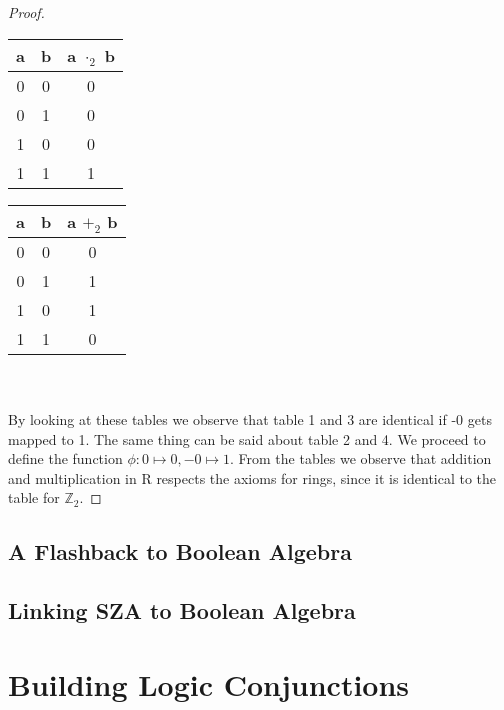 \documentclass[12pt]{report}
\theoremstyle{definition}
\theoremstyle{remark}
\begin{document}
\begin{proof}
\begin{minipage}{0.2\textwidth}
\begin{center}
\begin{tabular}{| c | c || c |}
            a & b & a $\cdot_2$ b \\ \hline
            0 & 0 & 0 \\ \hline
            0 & 1 & 0 \\ \hline
            1 & 0 & 0 \\ \hline
            1 & 1 & 1 \\ \hline
          \end{tabular}
        \end{center}
      \end{minipage}
      \begin{minipage}{0.2\textwidth}
        \begin{center}
          \begin{tabular}{| c | c || c |} \hline
            a & b & a $+_2$ b \\ \hline
            0 & 0 & 0 \\ \hline
            0 & 1 & 1 \\ \hline
            1 & 0 & 1 \\ \hline
            1 & 1 & 0 \\ \hline
          \end{tabular}
        \end{center}
      \end{minipage}\\\\

      By looking at these tables we observe that table 1 and 3 are identical if -0
      gets mapped to 1. The same thing can be said about table 2 and 4. We proceed to
      define the function $\phi: 0 \mapsto 0, -0 \mapsto 1$. From the tables we observe
      that addition and multiplication in R respects the axioms for rings, since
      it is identical to the table for $\mathbb{Z}_2$.
    \end{proof}

  \section{A Flashback to Boolean Algebra}
  \section{Linking SZA to Boolean Algebra}


\newpage

\chapter{Building Logic Conjunctions}
\end{document}

